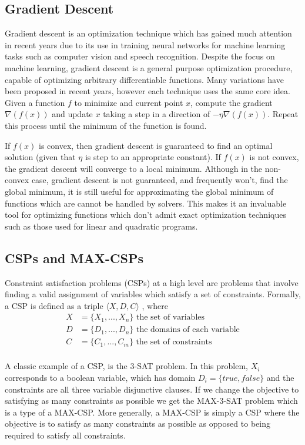 \documentclass[a4paper]{article}
\begin{document}
\subsection{Gradient Descent}

Gradient descent is an optimization technique which has gained much attention
in recent years due to  its use in training neural
networks for machine learning tasks such as computer vision and speech
recognition. Despite the focus on machine learning, gradient descent is a
general purpose optimization procedure, capable of optimizing arbitrary
differentiable functions. Many variations have been proposed in recent years,
however each technique uses the same core idea. Given a function $f$ to minimize and
current point $x$, compute the gradient $\nabla(f(x))$
and update $x$ taking a step in a direction of $-\eta \nabla(f(x))$. Repeat
this process until the minimum of the function is found. 

If $f(x)$ is convex, then gradient descent is guaranteed to find an optimal
solution (given that $\eta$ is step to an appropriate constant). If $f(x)$ is not convex, the gradient descent will converge to a
local minimum. Although in the non-convex case, gradient descent is not
guaranteed, and frequently won't, find the global minimum, it is still useful for
approximating the global minimum of functions which are cannot be handled by solvers.
This makes it an invaluable tool for optimizing functions which don't admit
exact optimization techniques such as those used for linear and
quadratic programs.

\subsection{CSPs and MAX-CSPs}

Constraint satisfaction problems (CSPs) at a high level are problems that involve
finding a valid assignment of variables which satisfy a set of constraints.  Formally, a 
CSP is defined as a triple $\langle X, D, C \rangle$ \cite{wiki_CSP}, where 
\begin{align*}
	X &= \{X_1, ..., X_n\} \text{ the set of variables}\\
	D &= \{D_1, ..., D_n\} \text{ the domains of each variable}\\
	C &= \{C_1, ..., C_m\} \text{ the set of constraints}\\
\end{align*}

A classic example of a CSP, is the 3-SAT problem. In this problem, 
$X_i$ corresponds to a boolean variable, which has domain $D_i = \{true, false\}$
and the constraints are all three variable disjunctive clauses. If we change the objective to satisfying as 
many constraints as possible we get the MAX-3-SAT problem which is a type of a 
MAX-CSP. More generally, a MAX-CSP is simply a CSP where the objective is to 
satisfy as many constraints as possible as opposed to being required to satisfy all 
constraints.
\end{document}
